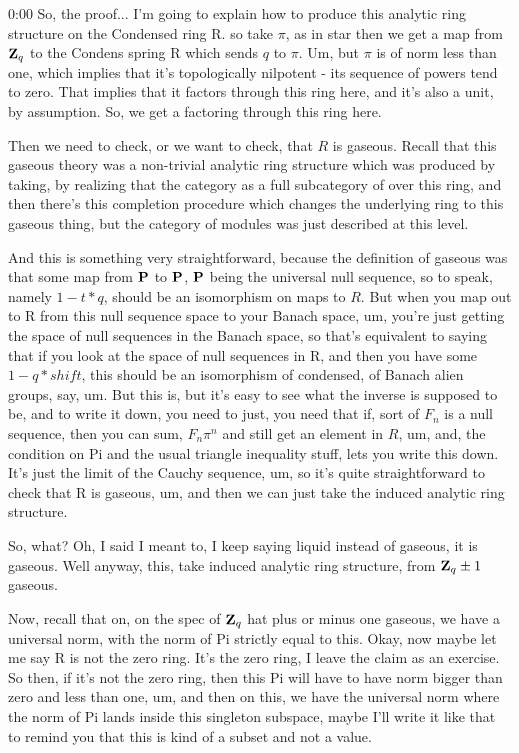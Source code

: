 \begin{unfinished}{0:00}
So, the proof... I'm going to explain how to produce this analytic ring structure on the Condensed ring R. so take $\pi$, as in star then we get a map from $\Z_q$ to the Condens spring R which sends $q$ to $\pi$. Um, but $\pi$ is of norm less than one, which implies that it's topologically nilpotent - its sequence of powers tend to zero. That implies that it factors through this ring here, and it's also a unit, by assumption. So, we get a factoring through this ring here.

Then we need to check, or we want to check, that $R$ is gaseous. Recall that this gaseous theory was a non-trivial analytic ring structure which was produced by taking, by realizing that the category as a full subcategory of over this ring, and then there's this completion procedure which changes the underlying ring to this gaseous thing, but the category of modules was just described at this level.

And this is something very straightforward, because the definition of gaseous was that some map from $\P$ to $\P$, $\P$ being the universal null sequence, so to speak, namely $1 - t * q$, should be an isomorphism on maps to $R$. But when you map out to R from this null sequence space to your Banach space, um, you're just getting the space of null sequences in the Banach space, so that's equivalent to saying that if you look at the space of null sequences in R, and then you have some $1 - q * shift$, this should be an isomorphism of condensed,  of Banach alien groups, say, um. But this is, but it's easy to see what the inverse is supposed to be, and to write it down, you need to just, you need that if, sort of $F_n$ is a null sequence, then you can sum, $F_n \pi^n$ and still get an element in $R$, um, and, the condition on Pi and the usual triangle inequality stuff, lets you write this down. It's just the limit of the Cauchy sequence, um, so it's quite straightforward to check that R is gaseous, um, and then we can just take the induced analytic ring structure.

So, what? Oh, I said I meant to, I keep saying liquid instead of gaseous, it is gaseous. Well anyway, this, take induced analytic ring structure, from $\Z_q \pm 1$ gaseous.

Now, recall that on, on the spec of $\Z_q$ hat plus or minus one gaseous, we have a universal norm, with the norm of Pi strictly equal to this. Okay, now maybe let me say R is not the zero ring. It's the zero ring, I leave the claim as an exercise. So then, if it's not the zero ring, then this Pi will have to have norm bigger than zero and less than one, um, and then on this, we have the universal norm where the norm of Pi lands inside this singleton subspace, maybe I'll write it like that to remind you that this is kind of a subset and not a value.


\end{unfinished}
